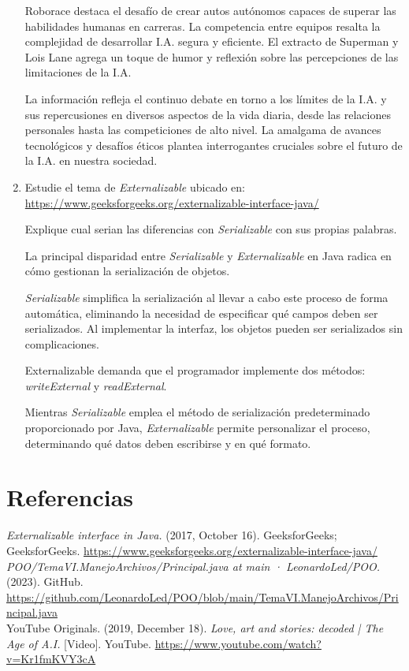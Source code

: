 \documentclass[12pt]{article}
\begin{document}
\begin{enumerate}
    Roborace destaca el desafío de crear autos autónomos capaces de superar las habilidades humanas en carreras. La competencia entre equipos resalta la complejidad de desarrollar I.A. segura y eficiente. El extracto de Superman y Lois Lane agrega un toque de humor y reflexión sobre las percepciones de las limitaciones de la I.A.

    La información refleja el continuo debate en torno a los límites de la I.A. y sus repercusiones en diversos aspectos de la vida diaria, desde las relaciones personales hasta las competiciones de alto nivel. La amalgama de avances tecnológicos y desafíos éticos plantea interrogantes cruciales sobre el futuro de la I.A. en nuestra sociedad.

    \item Estudie el tema de \textit{Externalizable} ubicado en: \url{https://www.geeksforgeeks.org/externalizable-interface-java/}
    
    Explique cual serian las diferencias con \textit{Serializable} con sus propias palabras.

    La principal disparidad entre \textit{Serializable} y \textit{Externalizable} en Java radica en cómo gestionan la serialización de objetos.

    \textit{Serializable} simplifica la serialización al llevar a cabo este proceso de forma automática, eliminando la necesidad de especificar qué campos deben ser serializados. Al implementar la interfaz, los objetos pueden ser serializados sin complicaciones.

    Externalizable demanda que el programador implemente dos métodos: \textit{writeExternal} y \textit{readExternal}.

    Mientras \textit{Serializable} emplea el método de serialización predeterminado proporcionado por Java, \textit{Externalizable} permite personalizar el proceso, determinando qué datos deben escribirse y en qué formato.
  \end{enumerate}

  \section*{Referencias}
  \textit{Externalizable interface in Java.} (2017, October 16). GeeksforGeeks; GeeksforGeeks. \url{https://www.geeksforgeeks.org/externalizable-interface-java/} \\

  \textit{POO/TemaVI.ManejoArchivos/Principal.java at main · LeonardoLed/POO.} (2023). GitHub. \url{https://github.com/LeonardoLed/POO/blob/main/TemaVI.ManejoArchivos/Principal.java} \\

  YouTube Originals. (2019, December 18). \textit{Love, art and stories: decoded | The Age of A.I.} [Video]. YouTube. \url{https://www.youtube.com/watch?v=Kr1fmKVY3cA}
\end{document}
